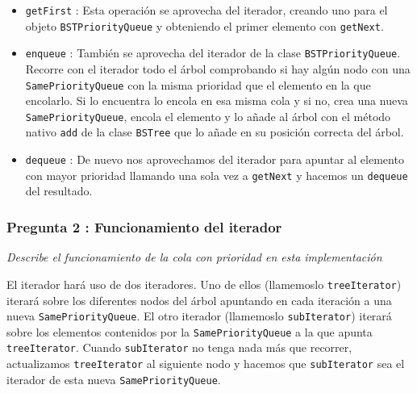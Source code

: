 \documentclass[a4paper, 12pt]{article}
\begin{document}
                \begin{itemize}
                    \item \texttt{getFirst} : Esta operación se aprovecha del
                    iterador, creando uno para el objeto 
                    \texttt{BSTPriorityQueue} y obteniendo el primer elemento
                    con \texttt{getNext}. \\\mbox{}
                    \item \texttt{enqueue} : También se aprovecha del iterador 
                    de la clase \texttt{BSTPriorityQueue}. Recorre con el
                    iterador todo el árbol comprobando si hay algún nodo con una 
                    \texttt{SamePriorityQueue} con la misma prioridad que el 
                    elemento en la que encolarlo. Si lo encuentra lo encola en 
                    esa misma cola y si no, crea una nueva 
                    \texttt{SamePriorityQueue}, encola el elemento y lo añade 
                    al árbol con el método nativo \texttt{add} de la clase 
                    \texttt{BSTree} que lo añade en su posición correcta del
                    árbol.
                    \item \texttt{dequeue} : De nuevo nos aprovechamos del
                    iterador para apuntar al elemento con mayor prioridad 
                    llamando una sola vez a \texttt{getNext} y hacemos un 
                    \texttt{dequeue} del resultado.
                \end{itemize}

            \subsubsection{Pregunta 2 : Funcionamiento del iterador}

                \textit{Describe el funcionamiento de la cola con prioridad en 
                esta implementación}\\\mbox{}

                El iterador hará uso de dos iteradores. Uno de ellos
                (llamemoslo \texttt{treeIterator}) iterará sobre los diferentes
                nodos del árbol apuntando en cada iteración a una nueva 
                \texttt{SamePriorityQueue}. El otro iterador (llamemoslo 
                \texttt{subIterator}) iterará sobre los elementos contenidos por
                la \texttt{SamePriorityQueue} a la que apunta 
                \texttt{treeIterator}. Cuando \texttt{subIterator} no tenga nada
                más que recorrer, actualizamos \texttt{treeIterator} al
                siguiente nodo y hacemos que \texttt{subIterator} sea el 
                iterador de esta nueva \texttt{SamePriorityQueue}.
\end{document}
